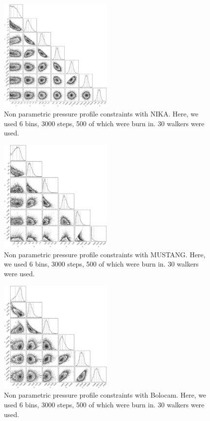 \begin{figure}[!h]
  \centering
  \includegraphics[width=0.5\textwidth]{NIKA_ml_deproj_figs/NIKA_Real_6_B_Real_3000S_500B_ML-YES_PP-YES_30W_contour.eps}
  \caption{Non parametric pressure profile constraints with NIKA. Here, we used 6 bins, 3000 steps, 500 of which were
    burn in. 30 walkers were used.}
  \label{fig:nika_contours}
\end{figure}
\begin{figure}[!h]
  \centering
  \includegraphics[width=0.5\textwidth]{NIKA_ml_deproj_figs/MUSTANG_RB_6_B_2500S_500B_ML-NO_30W_contour.eps}
  \caption{Non parametric pressure profile constraints with MUSTANG. Here, we used 6 bins, 3000 steps, 500 of which were
    burn in. 30 walkers were used.}
  \label{fig:mustang_contours}
\end{figure}
\begin{figure}[!h]
  \centering
  \includegraphics[width=0.5\textwidth]{NIKA_ml_deproj_figs/BOLOCAM_Real_6_B_Real_2500S_500B_ML-NO_PP-NO_30W_contour.eps}
  \caption{Non parametric pressure profile constraints with Bolocam. Here, we used 6 bins, 3000 steps, 500 of which were
    burn in. 30 walkers were used.}
  \label{fig:bolocam_contours}
\end{figure}

